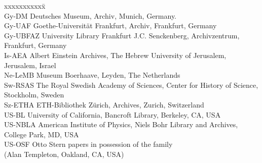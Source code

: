 \documentclass[12pt]{article}
\begin{document}
\begin{tabbing}
xxxxxxxxxxx\=\kill\\
Gy-DM     \> Deutsches Museum, Archiv, Munich, Germany. \\
Gy-UAF   \> Goethe-Universität Frankfurt, Archiv, Frankfurt, Germany\\
Gy-UBFAZ \> University Library Frankfurt J.C. Senckenberg, Archivzentrum,\\
                \> Frankfurt, Germany\\
Is-AEA      \> Albert Einstein Archives, The Hebrew University of Jerusalem,\\
                 \> Jerusalem, Israel\\
Ne-LeMB    \> Museum Boerhaave, Leyden, The Netherlands \\
Sw-RSAS \> The Royal Swedish Academy of Sciences, Center for History of Science, \\
                \> Stockholm, Sweden \\
Sz-ETHA  \> ETH-Bibliothek Z\"urich, Archives, Zurich, Switzerland \\
US-BL      \>  University of California, Bancroft Library, Berkeley, CA, USA\\
US-NBLA  \> American Institute of Physics,  Niels Bohr Library and Archives, \\
                 \> College Park, MD, USA\\
US-OSF \> Otto Stern papers in possession of the family \\
                  \> (Alan Templeton, Oakland, CA, USA) 
\end{tabbing}





\end{document}
